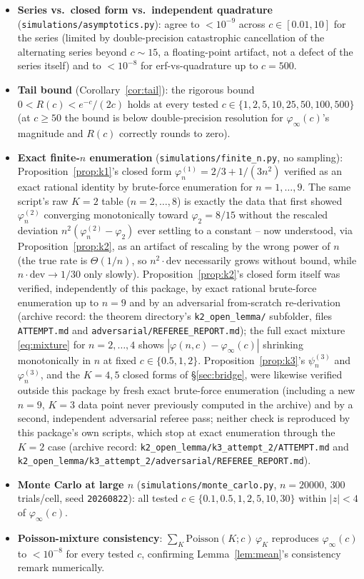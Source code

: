 \documentclass[11pt]{article}
\theoremstyle{remark}
\newcommand{\phiinf}{\varphi_\infty}
\begin{document}
\begin{itemize}
\item \textbf{Series vs.\ closed form vs.\ independent quadrature}
  (\texttt{simulations/asymptotics.py}): agree to $<10^{-9}$ across
  $c\in[0.01,10]$ for the series (limited by double-precision
  catastrophic cancellation of the alternating series beyond
  $c\!\sim\!15$, a floating-point artifact, not a defect of the series
  itself) and to $<10^{-8}$ for erf-vs-quadrature up to $c=500$.
\item \textbf{Tail bound} (Corollary~\ref{cor:tail}): the rigorous bound
  $0<R(c)<e^{-c}/(2c)$ holds at every tested $c\in\{1,2,5,10,25,50,100,500\}$
  (at $c\ge50$ the bound is below double-precision resolution for
  $\phiinf(c)$'s magnitude and $R(c)$ correctly rounds to zero).
\item \textbf{Exact finite-$n$ enumeration} (\texttt{simulations/finite\_n.py},
  no sampling): Proposition~\ref{prop:k1}'s closed form
  $\varphi_n^{(1)}=2/3+1/(3n^2)$ verified as an exact rational identity
  by brute-force enumeration for $n=1,\dots,9$. The same script's raw
  $K=2$ table ($n=2,\dots,8$) is exactly the data that first showed
  $\varphi_n^{(2)}$ converging monotonically toward $\varphi_2=8/15$
  without the rescaled deviation $n^2(\varphi_n^{(2)}-\varphi_2)$ ever
  settling to a constant -- now understood, via
  Proposition~\ref{prop:k2}, as an artifact of rescaling by the wrong
  power of $n$ (the true rate is $\Theta(1/n)$, so $n^2\cdot\text{dev}$
  necessarily grows without bound, while $n\cdot\text{dev}\to1/30$ only
  slowly). Proposition~\ref{prop:k2}'s closed form itself was verified,
  independently of this package, by exact rational brute-force
  enumeration up to $n=9$ and by an adversarial from-scratch
  re-derivation (archive record: the theorem directory's
  \texttt{k2\_open\_lemma/} subfolder, files \texttt{ATTEMPT.md} and
  \texttt{adversarial/REFEREE\_REPORT.md}); the full exact mixture
  \eqref{eq:mixture} for $n=2,\dots,4$ shows $|\varphi(n,c)-\phiinf(c)|$
  shrinking monotonically in $n$ at fixed $c\in\{0.5,1,2\}$.
  Proposition~\ref{prop:k3}'s $\psi_n^{(3)}$ and $\varphi_n^{(3)}$, and
  the $K=4,5$ closed forms of \S\ref{sec:bridge}, were likewise verified
  outside this package by fresh exact brute-force enumeration (including
  a new $n=9$, $K=3$ data point never previously computed in the
  archive) and by a second, independent adversarial referee pass; neither
  check is reproduced by this package's own scripts, which stop at
  exact enumeration through the $K=2$ case (archive record:
  \texttt{k2\_open\_lemma/k3\_attempt\_2/ATTEMPT.md} and
  \texttt{k2\_open\_lemma/k3\_attempt\_2/adversarial/REFEREE\_REPORT.md}).
\item \textbf{Monte Carlo at large $n$} (\texttt{simulations/monte\_carlo.py},
  $n=20000$, $300$ trials/cell, seed \texttt{20260822}): all tested
  $c\in\{0.1,0.5,1,2,5,10,30\}$ within $|z|<4$ of $\phiinf(c)$.
\item \textbf{Poisson-mixture consistency}: $\sum_K\mathrm{Poisson}(K;c)\,\varphi_K$
  reproduces $\phiinf(c)$ to $<10^{-8}$ for every tested $c$, confirming
  Lemma~\ref{lem:mean}'s consistency remark numerically.
\end{itemize}
\end{document}
